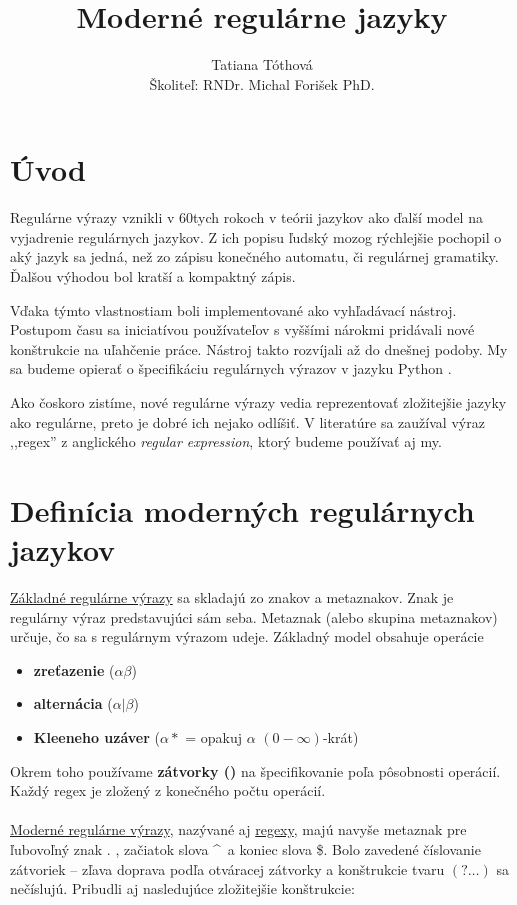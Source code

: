 \documentclass[myposter,portrait,plainboxedsections]{sciposter}
\def\mysection#1{
{\color{sectionCol}\section*{\sc\bfseries #1}}}
\begin{document}
\setlength{\logowidth}{20cm}
\setlength{\titlewidth}{\textwidth}
\addtolength{\titlewidth}{-\logowidth}
\useleftlogofalse

\color{textCol}

\title{Moderné regulárne jazyky}
\author{Tatiana Tóthová\\
        Školiteľ: RNDr. Michal Forišek PhD.}
\maketitle

\begin{multicols*}{3}

\mysection{Úvod}

Regulárne výrazy vznikli v 60tych rokoch v teórii jazykov ako ďalší model na vyjadrenie regulárnych jazykov. Z ich popisu ľudský mozog rýchlejšie pochopil o aký jazyk sa jedná, než zo zápisu konečného automatu, či regulárnej gramatiky. Ďalšou výhodou bol kratší a kompaktný zápis.

Vďaka týmto vlastnostiam boli implementované ako vyhľadávací nástroj. Postupom času sa iniciatívou používateľov s vyššími nárokmi pridávali nové konštrukcie na uľahčenie práce. Nástroj takto rozvíjali až do dnešnej podoby. My sa budeme opierať o špecifikáciu regulárnych výrazov v jazyku Python \cite{Python3Documentation}.

Ako čoskoro zistíme, nové regulárne výrazy vedia reprezentovať zložitejšie jazyky ako regulárne, preto je dobré ich nejako odlíšiť. V literatúre sa zaužíval výraz ,,regex'' z anglického \textit{regular expression}, ktorý budeme používať aj my.

\mysection{Definícia moderných regulárnych jazykov}

\underline{Základné regulárne výrazy} sa skladajú zo znakov a metaznakov. Znak je regulárny výraz predstavujúci sám seba. Metaznak (alebo skupina metaznakov) určuje, čo sa s regulárnym výrazom udeje. Základný model obsahuje operácie
\begin{itemize}
\item \textbf{zreťazenie} ($\alpha\beta$)
\item \textbf{alternácia} ($\alpha|\beta$) 
\item \textbf{Kleeneho uzáver} ($\alpha*$ = opakuj $\alpha$ $(0-\infty)$-krát)
\end{itemize}
Okrem toho používame \textbf{zátvorky ()} na špecifikovanie poľa pôsobnosti operácií. Každý regex je zložený z konečného počtu operácií.
\\ \\
\underline{Moderné regulárne výrazy}, nazývané aj \underline{regexy}, majú navyše metaznak pre ľubovoľný znak . , začiatok slova \textasciicircum ~a koniec slova \$. Bolo zavedené číslovanie zátvoriek -- zľava doprava podľa otváracej zátvorky a konštrukcie tvaru $(?\dots)$ sa nečíslujú. Pribudli aj nasledujúce zložitejšie konštrukcie:


\end{multicols*}
\end{document}
